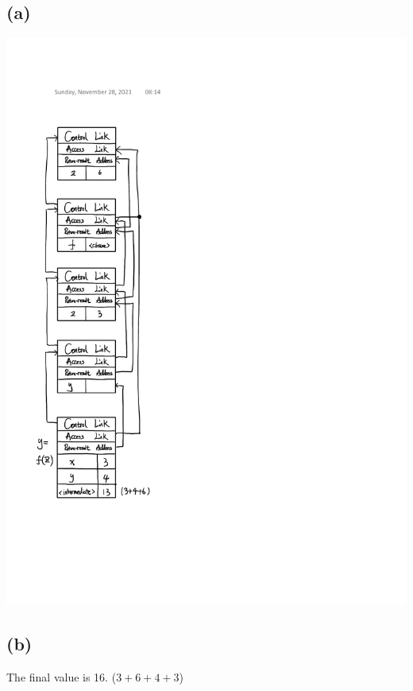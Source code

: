 \documentclass[12pt, a4paper]{article}
\begin{document}
	\subsection*{(a)}
	\begin{center}
		\includegraphics[scale=0.75]{Q4a.pdf}
	\end{center}
	
	\subsection*{(b)}
	The final value is 16. ($3 + 6 + 4 + 3$)
	
\end{document}

